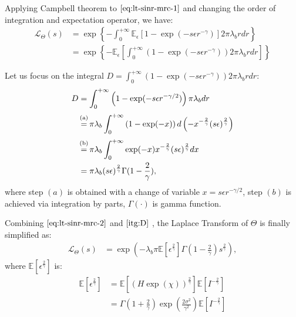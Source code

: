 Applying Campbell theorem to $\eqref{eq:lt-sinr-mrc-1}$ and changing the order of integration and expectation operator, we have:
\begin{align}
\label{eq:lt-sinr-mrc-2}
\mathcal{L}_{\Theta}\left( s \right) &= \exp \left\lbrace -\int_{0}^{+\infty}    \mathbb{E}_{\epsilon}\left[ 1-\exp(-s\epsilon r^{-\gamma} ) \right]   2 \pi \lambda_{b} r dr \right\rbrace \nonumber\\
&= \exp \left\lbrace -\mathbb{E}_{\epsilon}\left[ \int_{0}^{+\infty} \left(1-\exp(-s\epsilon r^{-\gamma} ) \right) 2 \pi \lambda_{b} r dr  \right]   \right\rbrace 
\end{align}

Let us focus on the integral $D = \int_{0}^{+\infty} \left(1-\exp(-s\epsilon r^{-\gamma} ) \right) 2 \pi \lambda_{b} r dr $:
\begin{align}
\label{itg:D}
D &= \int_{0}^{+\infty} \left(1-\exp(-s\epsilon r^{-\gamma/2} ) \right) \pi \lambda_{b} dr \nonumber\\
&\overset{\mathclap{\strut\text{(a)}}} = \pi \lambda_{b} \int_{0}^{+\infty} \left(1-\exp(-x ) \right) d\left( -x^{-\frac{2}{\gamma}} (s\epsilon)^{\frac{2}{\gamma}}\right)  \nonumber\\
&\overset{\mathclap{\strut\text{(b)}}}= \pi \lambda_{b} \int_{0}^{+\infty} \exp(-x ) x^{-\frac{2}{\gamma}} (s\epsilon)^{\frac{2}{\gamma}} dx \nonumber\\
&= \pi \lambda_{b}  (s\epsilon)^{\frac{2}{\gamma}}  \Gamma (1 - \frac{2}{\gamma}),
\end{align}
where step $(a)$ is obtained with a change of variable $x = s \epsilon r^{-\gamma/2}$, step $(b)$ is achieved via integration by parts, $\Gamma(\cdot)$ is gamma function.

Combining $\eqref{eq:lt-sinr-mrc-2}$ and $\eqref{itg:D}$ , the Laplace Transform of $\Theta$ is finally simplified as:
\begin{align}
\label{eq:lt_Theta}
\mathcal{L}_{\Theta}\left( s \right) &= \exp(-\lambda_{b} \pi \mathbb{E}\left[ \epsilon ^{\frac{2}{\gamma}} \right]  \Gamma(1-\frac{2}{\gamma}) s^{\frac{2}{\gamma}}),
\end{align}
where $\mathbb{E}\left[ \epsilon ^{\frac{2}{\gamma}} \right] $ is:
\begin{align}
\label{eq:epsilon_fractional_moment}
\mathbb{E}\left[ \epsilon ^{\frac{2}{\gamma}} \right]  &= \mathbb{E}\left[ \left( H \exp(\chi)\right)  ^{\frac{2}{\gamma}} \right] \mathbb{E}\left[ I ^{-\frac{2}{\gamma}}\right] \nonumber\\
&=\Gamma(1+\frac{2}{\gamma}) \exp( \frac{2\sigma^2}{\gamma^2}) \mathbb{E}\left[ I ^{-\frac{2}{\gamma}}\right] 
\end{align}

